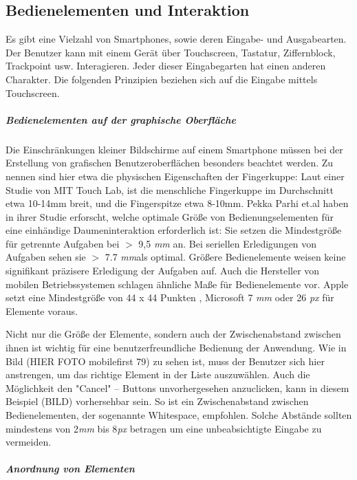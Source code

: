 \subsection{Bedienelementen und Interaktion}
\label{sub:Benutzerschnittstellen}

Es gibt eine Vielzahl von Smartphones, sowie deren Eingabe- und Ausgabearten. Der Benutzer kann mit einem Gerät über Touchscreen, Tastatur, Ziffernblock, Trackpoint usw. Interagieren. Jeder dieser Eingabegarten hat einen anderen Charakter. Die folgenden Prinzipien beziehen sich auf  die Eingabe mittels Touchscreen.
\subparagraph{Bedienelementen auf der graphische Oberfläche} 
\label{subp:gro_ere_interface_elementen}

Die Einschränkungen kleiner Bildschirme auf einem Smartphone müssen bei der Erstellung von grafischen Benutzeroberflächen besonders beachtet werden. Zu nennen sind hier etwa die physischen Eigenschaften der Fingerkuppe: Laut einer Studie von MIT Touch Lab, ist die menschliche Fingerkuppe im Durchschnitt etwa 10-14mm breit, und die Fingerspitze etwa 8-10mm\cite{Srinivasan:2003uu}.  Pekka Parhi  et.al haben in ihrer Studie \cite{Parhi:2006gh} erforscht, welche optimale Größe von Bedienungselementen für eine einhändige Daumeninteraktion erforderlich ist: Sie setzen die Mindestgröße für getrennte Aufgaben bei $>$ 9,5 \textit{mm} an.  Bei seriellen Erledigungen von Aufgaben sehen sie $>$ 7.7 \textit{mm}als optimal. Größere Bedienelemente weisen keine signifikant präzisere Erledigung der Aufgaben auf.
Auch die Hersteller von mobilen Betriebssystemen schlagen ähnliche Maße für Bedienelemente vor. Apple setzt eine Mindestgröße von 44 x 44 Punkten \cite{Apple}, Microsoft 7 \textit{mm} oder 26 \textit{px}\cite{lukeGUI} für Elemente voraus.

Nicht nur die Größe der Elemente, sondern auch der Zwischenabstand zwischen ihnen ist wichtig für eine benutzerfreundliche Bedienung der Anwendung. Wie in Bild (HIER FOTO mobilefirst 79) zu sehen ist, muss der Benutzer sich hier anstrengen, um das richtige Element in der Liste auszuwählen. Auch die Möglichkeit den "Cancel" – Buttons unvorhergesehen anzuclicken, kann in diesem Beispiel (BILD) vorhersehbar sein. So ist ein Zwischenabstand zwischen Bedienelementen, der sogenannte Whitespace,  empfohlen. Solche Abstände sollten mindestens von 2\textit{mm} bis 8\textit{px} betragen\cite{lukeGUI} um eine unbeabsichtigte Eingabe zu vermeiden.

\subparagraph{Anordnung von Elementen} 
\label{subp:anordnung_von_elementen}

